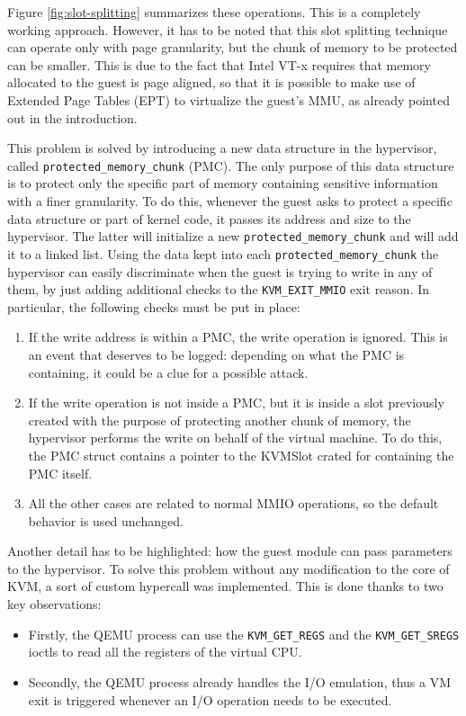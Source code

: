 Figure \ref{fig:slot-splitting} summarizes these operations. This is a completely working approach. However, it has to be noted that this slot splitting technique can operate only with page granularity, but the chunk of memory to be protected can be smaller. This is due to the fact that Intel VT-x requires that memory allocated to the guest is page aligned, so that it is possible to make use of Extended Page Tables (EPT) to virtualize the guest's MMU, as already pointed out in the introduction. 
\par 
This problem is solved by introducing a new data structure in the hypervisor, called \texttt{protected\_memory\_chunk} (PMC). The only purpose of this data structure is to protect only the specific part of memory containing sensitive information with a finer granularity. To do this, whenever the guest asks to protect a specific data structure or part of kernel code, it passes its address and size to the hypervisor. The latter will initialize a new \texttt{protected\_memory\_chunk} and will add it to a linked list. Using the data kept into each \texttt{protected\_memory\_chunk} the hypervisor can easily discriminate when the guest is trying to write in any of them, by just adding additional checks to the \texttt{KVM\_EXIT\_MMIO} exit reason. In particular, the following checks must be put in place: 
\begin{enumerate}
    \item If the write address is within a PMC, the write operation is ignored. This is an event that deserves to be logged: depending on what the PMC is containing, it could be a clue for a possible attack.
    \item If the write operation is not inside a PMC, but it is inside a slot previously created with the purpose of protecting another chunk of memory, the hypervisor performs the write on behalf of the virtual machine. To do this, the PMC struct contains a pointer to the KVMSlot crated for containing the PMC itself.
    \item All the other cases are related to normal MMIO operations, so the default behavior is used unchanged.
\end{enumerate}
\par
Another detail has to be highlighted: how the guest module can pass parameters to the hypervisor. To solve this problem without any modification to the core of KVM, a sort of custom hypercall was implemented. This is done thanks to two key observations: 
\begin{itemize}
    \item Firstly, the QEMU process can use the \texttt{KVM\_GET\_REGS} and the \texttt{KVM\_GET\_SREGS} ioctls to read all the registers of the virtual CPU. 
    \item Secondly, the QEMU process already handles the I/O emulation, thus a VM exit is triggered whenever an I/O operation needs to be executed. 
\end{itemize}
